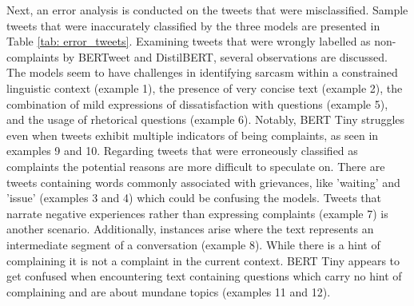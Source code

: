Next, an error analysis is conducted on the tweets that were misclassified. Sample tweets that were inaccurately classified by the three models are presented in Table \ref{tab: error_tweets}. Examining tweets that were wrongly labelled as non-complaints by BERTweet and DistilBERT, several observations are discussed. The models seem to have challenges in identifying sarcasm within a constrained linguistic context (example 1), the presence of very concise text (example 2), the combination of mild expressions of dissatisfaction with questions (example 5), and the usage of rhetorical questions (example 6). Notably, BERT Tiny struggles even when tweets exhibit multiple indicators of being complaints, as seen in examples 9 and 10. Regarding tweets that were erroneously classified as complaints the potential reasons are more difficult to speculate on. There are tweets containing words commonly associated with grievances, like 'waiting' and 'issue' (examples 3 and 4) which could be confusing the models. Tweets that narrate negative experiences rather than expressing complaints (example 7) is another scenario. Additionally, instances arise where the text represents an intermediate segment of a conversation (example 8). While there is a hint of complaining it is not a complaint in the current context. BERT Tiny appears to get confused when encountering text containing questions which carry no hint of complaining and are about mundane topics (examples 11 and 12).

